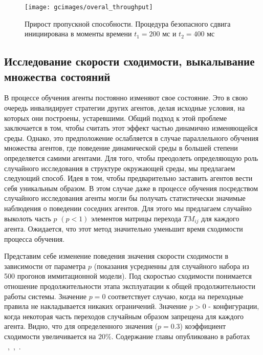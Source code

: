 \begin{figure}
    \centering
    \texttt{[image: gcimages/overal\_throughput]}
    \caption{Прирост пропускной способности. Процедура безопасного сдвига инициирована в моменты времени $t_1=200$ мс и $t_2=400$ мс }
    \label{fig:safe_shift_overal_throughput}
\end{figure}

\subsection{Исследование скорости сходимости, выкалывание множества состояний}
В процессе обучения агенты постоянно изменяют свое состояние. Это в свою очередь инвалидирует стратегии других агентов, делая исходные условия, на которых они построены, устаревшими. Общий подход к этой проблеме заключается в том, чтобы считать этот эффект частью динамично изменяющейся среды. Однако, это предположение ослабляется в случае параллельного обучения множества агентов, где поведение динамической среды в большей степени определяется самими агентами.
Для того, чтобы преодолеть определяющую роль случайного исследования в структуре окружающей среды, мы предлагаем следующий способ. Идея в том, чтобы предварительно заставить агентов вести себя уникальным образом. В этом случае даже в процессе обучения посредством случайного исследования агенты могли бы получать статистически значимые наблюдения о поведении соседних агентов. Для этого мы предлагаем случайно выколоть часть $p$ $(p< 1)$ элементов матрицы перехода $TM_{ij}$ для каждого агента. Ожидается, что этот метод значительно уменьшит время сходимости процесса обучения.

Представим себе изменение поведения значения скорости сходимости в зависимости от параметра $p$ (показания усредненны для случайного набора из 500 прогонов иммитационной модели). Под скоростью сходимости понимается отношение продолжительности этапа эксплуатации к общей продолжительности работы системы. Значение $p = 0$ соответствует случаю, когда на переходные правила не накладывается никаких ограничений. Значение $p>0$ - конфигурации, когда некоторая часть переходов случайным образом запрещена для каждого агента. Видно, что для определенного значения ($p=0.3$) коэффициент сходимости увеличивается на $20\%$.
Содержание главы опубликовано в работах ~\cite{5G},~\cite{globecom},~\cite{ent-2017}.




